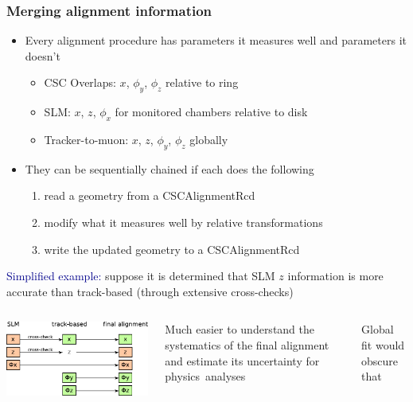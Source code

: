 \documentclass[compress]{beamer}
\begin{document}
\begin{frame}
\frametitle{Merging alignment information}
\begin{itemize}
\item Every alignment procedure has parameters it measures well and parameters it doesn't
\begin{itemize}
\item CSC Overlaps: $x$, $\phi_y$, $\phi_z$ relative to ring
\item SLM: $x$, $z$, $\phi_x$ for monitored chambers relative to disk
\item Tracker-to-muon: $x$, $z$, $\phi_y$, $\phi_z$ globally
\end{itemize}

\item They can be sequentially chained if each does the following
\begin{enumerate}
\item read a geometry from a CSCAlignmentRcd
\item modify what it measures well by relative transformations
\item write the updated geometry to a CSCAlignmentRcd
\end{enumerate}
\end{itemize}

\textcolor{darkblue}{Simplified example:} suppose it is determined that SLM $z$ information is more
accurate than track-based (through extensive cross-checks)

\begin{center}
\begin{columns}

\includegraphics[width=\linewidth]{merging_information.pdf}

Much easier to understand the systematics of the final alignment and estimate its uncertainty for \mbox{physics analyses\hspace{-1 cm}}

\vspace{0.25 cm}
Global fit would obscure that
\end{columns}
\end{center}
\end{frame}
\end{document}
